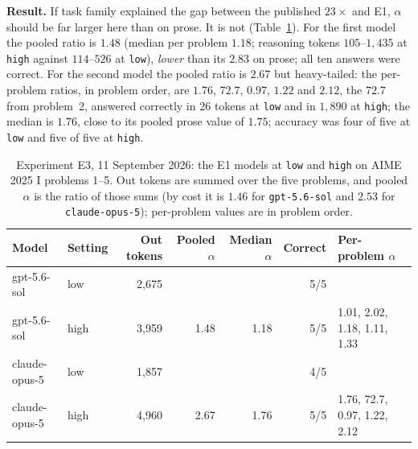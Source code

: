 \documentclass[11pt]{article}
\begin{document}
\textbf{Result.} If task family explained the gap between the published $23\times$ and
E1, $\alpha$ should be far larger here than on prose. It is not
(Table~\ref{tab:e3}). For the first model the pooled ratio is $1.48$ (median per problem
$1.18$; reasoning tokens $105$--$1{,}435$ at \texttt{high} against $114$--$526$ at
\texttt{low}), \emph{lower} than its $2.83$ on prose; all ten answers were correct. For
the second model the pooled ratio is $2.67$ but heavy-tailed: the per-problem ratios, in problem order, are
$1.76$, $72.7$, $0.97$, $1.22$ and $2.12$, the $72.7$ from problem~2, answered correctly in
$26$ tokens at \texttt{low} and in $1{,}890$ at \texttt{high}; the median is $1.76$,
close to its pooled prose value of $1.75$; accuracy was four of five at \texttt{low} and five of five at
\texttt{high}.

\begin{table}[h]
\centering
\footnotesize
\begin{tabular}{llrrrrl}
\toprule
Model & Setting & Out tokens & Pooled $\alpha$ & Median $\alpha$ & Correct & Per-problem $\alpha$ \\
\midrule
gpt-5.6-sol & low & 2{,}675 & & & 5/5 & \\
gpt-5.6-sol & high & 3{,}959 & 1.48 & 1.18 & 5/5 & 1.01, 2.02, 1.18, 1.11, 1.33 \\
claude-opus-5 & low & 1{,}857 & & & 4/5 & \\
claude-opus-5 & high & 4{,}960 & 2.67 & 1.76 & 5/5 & 1.76, 72.7, 0.97, 1.22, 2.12 \\
\bottomrule
\end{tabular}
\caption{Experiment E3, 11 September 2026: the E1 models at \texttt{low} and \texttt{high} on AIME 2025 I
problems 1--5. Out tokens are summed over the five problems, and pooled $\alpha$ is the ratio of those sums (by cost it is $1.46$ for \texttt{gpt-5.6-sol} and $2.53$ for \texttt{claude-opus-5}); per-problem values
are in problem order.}
\label{tab:e3}
\end{table}
\end{document}
